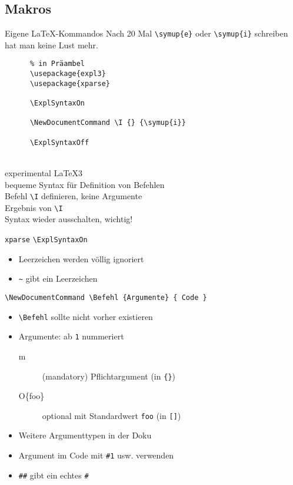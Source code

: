 \subsection{Makros}

\begin{frame}[fragile]{Eigene \LaTeX-Kommandos}
  Nach 20 Mal \lstinline+\symup{e}+ oder \lstinline+\symup{i}+ schreiben hat man keine Lust mehr.

  \vspace{2em}
  \begin{CodeExplanation}{0.45}
    \begin{lstlisting}
      % in Präambel
      \usepackage{expl3}
      \usepackage{xparse}

      \ExplSyntaxOn

      \NewDocumentCommand \I {} {\symup{i}}

      \ExplSyntaxOff
    \end{lstlisting}
  \Explanation
    \strut \\
    experimental \LaTeX3 \\[2\baselineskip]
    bequeme Syntax für Definition von Befehlen \\[\baselineskip]
    Befehl \lstinline+\I+ definieren, keine Argumente \\[\baselineskip]
    Ergebnis von \lstinline+\I+ \\[2\baselineskip]
    Syntax wieder ausschalten, wichtig!
  \end{CodeExplanation}
\end{frame}

\begin{frame}[fragile]{
  \texttt{xparse}
  \hfill
}
  \lstinline+\ExplSyntaxOn+
  \begin{itemize}
    \item Leerzeichen werden völlig ignoriert
    \item \lstinline+~+ gibt ein Leerzeichen
  \end{itemize}

  \lstinline+\NewDocumentCommand \Befehl {Argumente} { Code }+
  \begin{itemize}
    \item \lstinline+\Befehl+ sollte nicht vorher existieren
    \item Argumente: ab \texttt{1} nummeriert
      \begin{description}
        \item[m] (mandatory) Pflichtargument (in \lstinline+{}+)
        \item[O\{foo\}] optional mit Standardwert \texttt{foo} (in \lstinline+[]+)
      \end{description}
    \item Weitere Argumenttypen in der Doku
    \item Argument im Code mit \lstinline+#1+ usw. verwenden
    \item \lstinline+##+ gibt ein echtes \lstinline+#+
  \end{itemize}
\end{frame}

